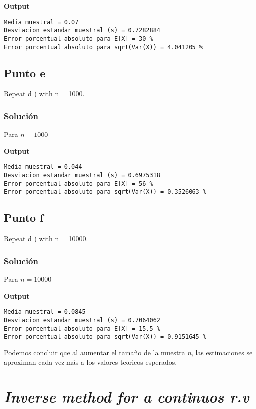 \documentclass[12pt]{article}
\begin{document}
\textbf{Output}

\begin{lstlisting}
Media muestral = 0.07
Desviacion estandar muestral (s) = 0.7282884
Error porcentual absoluto para E[X] = 30 %
Error porcentual absoluto para sqrt(Var(X)) = 4.041205 %
\end{lstlisting}



\subsection{Punto e}
Repeat d ) with n = 1000.

\subsubsection{Solución}

Para $n=1000$


\textbf{Output}


\begin{lstlisting}
Media muestral = 0.044
Desviacion estandar muestral (s) = 0.6975318
Error porcentual absoluto para E[X] = 56 %
Error porcentual absoluto para sqrt(Var(X)) = 0.3526063 %
\end{lstlisting}




\subsection{Punto f}
Repeat d ) with n = 10000.

\subsubsection{Solución}

Para $n=10000$


\textbf{Output}


\begin{lstlisting}
Media muestral = 0.0845
Desviacion estandar muestral (s) = 0.7064062
Error porcentual absoluto para E[X] = 15.5 %
Error porcentual absoluto para sqrt(Var(X)) = 0.9151645 %
\end{lstlisting}

Podemos concluir que al aumentar el tamaño de la muestra $n$, las estimaciones se aproximan cada vez más a los valores teóricos esperados.




\section{\textit{Inverse method for a continuos r.v}}
\end{document}
